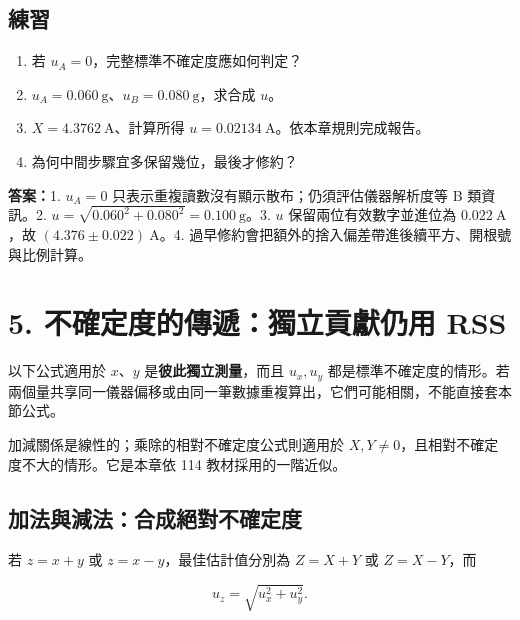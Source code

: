 \documentclass[11pt,a4paper]{article}
\providecommand{\tightlist}{%
  \setlength{\itemsep}{0pt}\setlength{\parskip}{0pt}}
\begin{document}
\begin{HandoutSelfCheck}

\subsection{練習}\label{ux7df4ux7fd2-3}

\begin{enumerate}
\def\labelenumi{\arabic{enumi}.}
\tightlist
\item
  若 \(u_A=0\)，完整標準不確定度應如何判定？
\item
  \(u_A=0.060\ \mathrm{g}\)、\(u_B=0.080\ \mathrm{g}\)，求合成 \(u\)。
\item
  \(X=4.3762\ \mathrm{A}\)、計算所得 \(u=0.02134\ \mathrm{A}\)。依本章規則完成報告。
\item
  為何中間步驟宜多保留幾位，最後才修約？
\end{enumerate}

\textbf{答案：}1. \(u_A=0\) 只表示重複讀數沒有顯示散布；仍須評估儀器解析度等 B 類資訊。2. \(u=\sqrt{0.060^2+0.080^2}=0.100\ \mathrm{g}\)。3. \(u\) 保留兩位有效數字並進位為 \(0.022\ \mathrm{A}\)，故 \((4.376\pm0.022)\ \mathrm{A}\)。4. 過早修約會把額外的捨入偏差帶進後續平方、開根號與比例計算。

\end{HandoutSelfCheck}

\section{5. 不確定度的傳遞：獨立貢獻仍用 RSS}\label{ux4e0dux78baux5b9aux5ea6ux7684ux50b3ux905eux7368ux7acbux8ca2ux737bux4ecdux7528-rss}

以下公式適用於 \(x\)、\(y\) 是\textbf{彼此獨立測量}，而且 \(u_x,u_y\) 都是標準不確定度的情形。若兩個量共享同一儀器偏移或由同一筆數據重複算出，它們可能相關，不能直接套本節公式。

加減關係是線性的；乘除的相對不確定度公式則適用於 \(X,Y\ne0\)，且相對不確定度不大的情形。它是本章依 114 教材採用的一階近似。

\subsection{加法與減法：合成絕對不確定度}\label{ux52a0ux6cd5ux8207ux6e1bux6cd5ux5408ux6210ux7d55ux5c0dux4e0dux78baux5b9aux5ea6}

若 \(z=x+y\) 或 \(z=x-y\)，最佳估計值分別為 \(Z=X+Y\) 或 \(Z=X-Y\)，而

\[
\boxed{u_z=\sqrt{u_x^2+u_y^2}}.
\]
\end{document}
